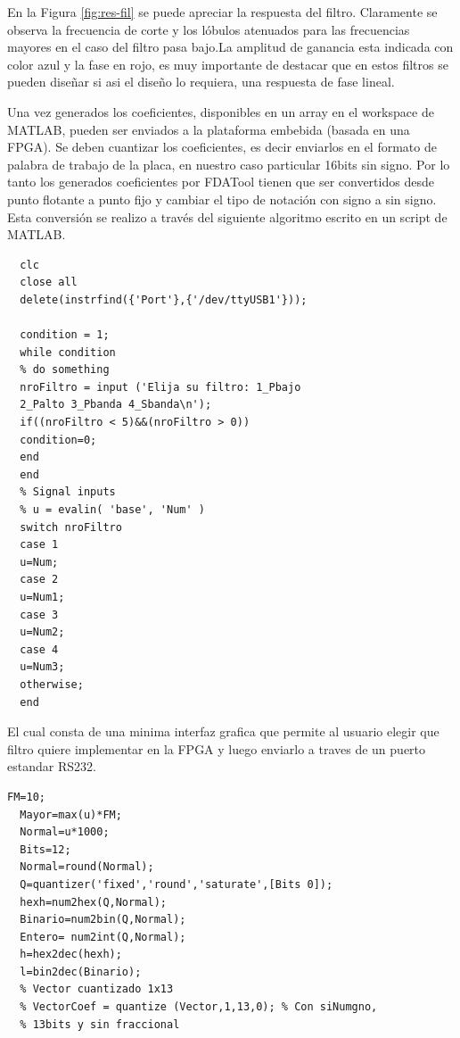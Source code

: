 \documentclass[conference]{IEEEtran}
\begin{document}
En la Figura \ref{fig:res-fil}  se puede apreciar la respuesta del
filtro. Claramente se observa la frecuencia de corte y los lóbulos
atenuados para las frecuencias mayores en el caso del filtro pasa
bajo.La amplitud de ganancia esta indicada con color azul y la fase en
rojo, es muy importante de destacar que en estos filtros se pueden
diseñar si asi el diseño lo requiera,  una respuesta de fase lineal.


Una vez generados los coeficientes, disponibles en un
array en el workspace de MATLAB, pueden ser  enviados a la plataforma
embebida (basada en una FPGA). Se deben cuantizar los coeficientes, es decir
enviarlos en el formato de palabra de trabajo de la placa, en nuestro
caso particular 16bits sin signo. Por lo tanto los generados
coeficientes por FDATool tienen que ser convertidos desde punto flotante
a punto fijo y cambiar el tipo de notación con signo a sin signo. 
Esta conversión se realizo a través del siguiente algoritmo escrito en
un script de MATLAB.
\begin{lstlisting}[frame=single]
%%%%%%FiltroV1%%%%
  clc
  close all
  delete(instrfind({'Port'},{'/dev/ttyUSB1'}));
  
  condition = 1;
  while condition
  % do something
  nroFiltro = input ('Elija su filtro: 1_Pbajo 
  2_Palto 3_Pbanda 4_Sbanda\n');
  if((nroFiltro < 5)&&(nroFiltro > 0))
  condition=0;
  end 
  end
  % Signal inputs
  % u = evalin( 'base', 'Num' )
  switch nroFiltro
  case 1
  u=Num;
  case 2
  u=Num1;
  case 3
  u=Num2;
  case 4   
  u=Num3;
  otherwise;
  end
\end{lstlisting}
El cual consta de una minima interfaz grafica que permite al usuario
elegir que filtro quiere implementar en la FPGA y luego enviarlo a
traves de un puerto estandar RS232.

\begin{lstlisting}[frame=single]
  FM=10;
  Mayor=max(u)*FM;
  Normal=u*1000;
  Bits=12;
  Normal=round(Normal);
  Q=quantizer('fixed','round','saturate',[Bits 0]);
  hexh=num2hex(Q,Normal);
  Binario=num2bin(Q,Normal);
  Entero= num2int(Q,Normal);
  h=hex2dec(hexh);
  l=bin2dec(Binario);
  % Vector cuantizado 1x13
  % VectorCoef = quantize (Vector,1,13,0); % Con siNumgno, 
  % 13bits y sin fraccional
\end{lstlisting}
\end{document}
